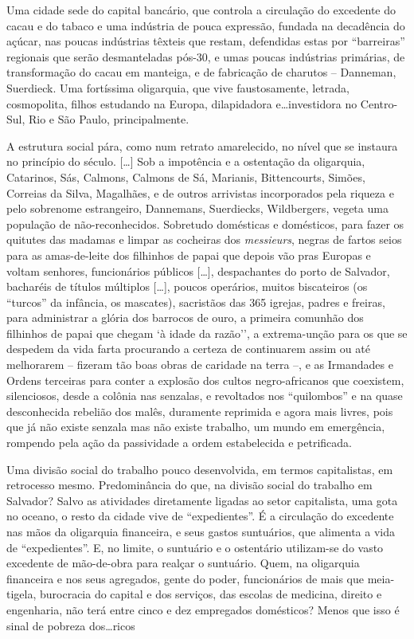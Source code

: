 \begin{citacao}
Uma cidade sede do capital bancário, que controla a circulação do excedente do cacau e do tabaco e uma indústria de pouca expressão, fundada na decadência do açúcar, nas poucas indústrias têxteis que restam, defendidas estas por ``barreiras'' regionais que serão desmanteladas pós-30, e umas poucas indústrias primárias, de transformação do cacau em manteiga, e de fabricação de charutos -- Danneman, Suerdieck. Uma fortíssima oligarquia, que vive faustosamente, letrada, cosmopolita, filhos estudando na Europa, dilapidadora e\dots investidora no Centro-Sul, Rio e São Paulo, principalmente.

A estrutura social pára, como num retrato amarelecido, no nível que se instaura no princípio do século. [\dots] Sob a impotência e a ostentação da oligarquia, Catarinos, Sás, Calmons, Calmons de Sá, Marianis, Bittencourts, Simões, Correias da Silva, Magalhães, e de outros arrivistas incorporados pela riqueza e pelo sobrenome estrangeiro, Dannemans, Suerdiecks, Wildbergers, vegeta uma população de não-reconhecidos. Sobretudo domésticas e domésticos, para fazer os quitutes das madamas e limpar as cocheiras dos \textit{messieurs}, negras de fartos seios para as amas-de-leite dos filhinhos de papai que depois vão pras Europas e voltam senhores, funcionários públicos [\dots], despachantes do porto de Salvador, bacharéis de títulos múltiplos [\dots], poucos operários, muitos biscateiros (os ``turcos'' da infância, os mascates), sacristãos das 365 igrejas, padres e freiras, para administrar a glória dos barrocos de ouro, a primeira comunhão dos filhinhos de papai que chegam `à idade da razão'', a extrema-unção para os que se despedem da vida farta procurando a certeza de continuarem assim ou até melhorarem -- fizeram tão boas obras de caridade na terra --, e as Irmandades e Ordens terceiras para conter a explosão dos cultos negro-africanos que coexistem, silenciosos, desde a colônia nas senzalas, e revoltados nos ``quilombos'' e na quase desconhecida rebelião dos malês, duramente reprimida e agora mais livres, pois que já não existe senzala mas não existe trabalho, um mundo em emergência, rompendo pela ação da passividade a ordem estabelecida e petrificada. \cite[p.~32-34]{OLIVEIRA1987}
\end{citacao}

\begin{citacao}
Uma divisão social do trabalho pouco desenvolvida, em termos capitalistas, em retrocesso mesmo. Predominância do que, na divisão social do trabalho em Salvador? Salvo as atividades diretamente ligadas ao setor capitalista, uma gota no oceano, o resto da cidade vive de ``expedientes''. É a circulação do excedente nas mãos da oligarquia financeira, e seus gastos suntuários, que alimenta a vida de ``expedientes''. E, no limite, o suntuário e o ostentário utilizam-se do vasto excedente de mão-de-obra para realçar o suntuário. Quem, na oligarquia financeira e nos seus agregados, gente do poder, funcionários de mais que meia-tigela, burocracia do capital e dos serviços, das escolas de medicina, direito e engenharia, não terá entre cinco e dez empregados domésticos? Menos que isso é sinal de pobreza dos\dots ricos \cite[p.~35]{OLIVEIRA1987}
\end{citacao}

